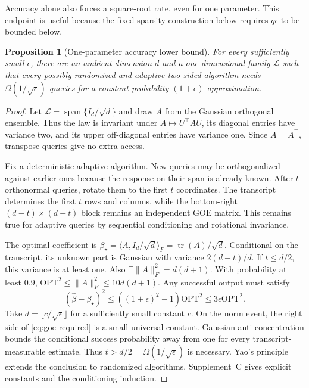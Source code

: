 \documentclass[twoside]{article}
\newtheorem{proposition}[theorem]{Proposition}
\newcommand{\E}{\mathbb E}
\newcommand{\tr}{\operatorname{tr}}
\newcommand{\cL}{\mathcal L}
\newcommand{\OPT}{\mathrm{OPT}}
\begin{document}
Accuracy alone also forces a square-root rate, even for one parameter. This endpoint is useful because the fixed-sparsity construction below requires $q\epsilon$ to be bounded below.

\begin{proposition}[One-parameter accuracy lower bound]
\label{prop:one-parameter}
For every sufficiently small $\epsilon$, there are an ambient dimension $d$ and a one-dimensional family $\cL$ such that every possibly randomized and adaptive two-sided algorithm needs $\Omega(1/\sqrt\epsilon)$ queries for a constant-probability $(1+\epsilon)$ approximation.
\end{proposition}

\begin{proof}
Let $\cL=\operatorname{span}\{I_d/\sqrt d\}$ and draw $A$ from the Gaussian orthogonal ensemble. Thus the law is invariant under $A\mapsto U^\top AU$, its diagonal entries have variance two, and its upper off-diagonal entries have variance one. Since $A=A^\top$, transpose queries give no extra access.

Fix a deterministic adaptive algorithm. New queries may be orthogonalized against earlier ones because the response on their span is already known. After $t$ orthonormal queries, rotate them to the first $t$ coordinates. The transcript determines the first $t$ rows and columns, while the bottom-right $(d-t)\times(d-t)$ block remains an independent GOE matrix. This remains true for adaptive queries by sequential conditioning and rotational invariance.

The optimal coefficient is $\beta_\star=\langle A,I_d/\sqrt d\rangle_F=\tr(A)/\sqrt d$. Conditional on the transcript, its unknown part is Gaussian with variance $2(d-t)/d$. If $t\le d/2$, this variance is at least one. Also $\E\|A\|_F^2=d(d+1)$. With probability at least $0.9$, $\OPT^2\le\|A\|_F^2\le10d(d+1)$. Any successful output must satisfy
\begin{equation}
 (\widehat\beta-\beta_\star)^2
 \le((1+\epsilon)^2-1)\OPT^2
 \le3\epsilon\OPT^2.
 \label{eq:goe-required}
\end{equation}
Take $d=\lfloor c/\sqrt\epsilon\rfloor$ for a sufficiently small constant $c$. On the norm event, the right side of \eqref{eq:goe-required} is a small universal constant. Gaussian anti-concentration bounds the conditional success probability away from one for every transcript-measurable estimate. Thus $t>d/2=\Omega(1/\sqrt\epsilon)$ is necessary. Yao's principle extends the conclusion to randomized algorithms. Supplement~C gives explicit constants and the conditioning induction.
\end{proof}
\end{document}
